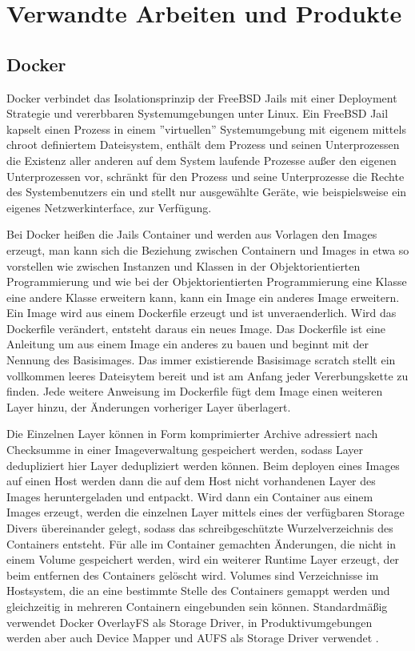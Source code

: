 \section{Verwandte Arbeiten und Produkte}
\label{sec:related-work}


\subsection{Docker}
Docker verbindet das Isolationsprinzip der FreeBSD Jails mit einer Deployment
Strategie und vererbbaren Systemumgebungen unter Linux.
Ein FreeBSD Jail kapselt einen Prozess in einem ''virtuellen'' Systemumgebung
mit eigenem mittels chroot definiertem Dateisystem, enthält dem Prozess und
seinen Unterprozessen die Existenz aller anderen auf dem System laufende
Prozesse außer den eigenen Unterprozessen vor, schränkt für den Prozess und
seine Unterprozesse die Rechte des Systembenutzers ein und stellt nur
ausgewählte Geräte, wie beispielsweise ein eigenes Netzwerkinterface, zur
Verfügung. \cite{FreeBSD-Jail-doc} \cite{FreeBSD-Jail-developer-comments}
\cite{FreeBSD-Jail-paper}

Bei Docker heißen die Jails Container und werden aus Vorlagen den Images
erzeugt, man kann sich die Beziehung zwischen Containern und Images in etwa so
vorstellen wie zwischen Instanzen und Klassen in der Objektorientierten
Programmierung und wie bei der Objektorientierten Programmierung eine Klasse
eine andere Klasse erweitern kann, kann ein Image ein anderes Image erweitern.
Ein Image wird aus einem Dockerfile erzeugt und ist unveraenderlich. Wird das
Dockerfile verändert, entsteht daraus ein neues Image. Das Dockerfile ist eine
Anleitung um aus einem Image ein anderes zu bauen und beginnt mit der Nennung
des Basisimages. Das immer existierende Basisimage scratch stellt ein vollkommen
leeres Dateisytem bereit und ist am Anfang jeder Vererbungskette zu finden. Jede
weitere Anweisung im Dockerfile fügt dem Image einen weiteren Layer hinzu, der
Änderungen vorheriger Layer überlagert.

Die Einzelnen Layer können in Form komprimierter Archive adressiert nach
Checksumme in einer Imageverwaltung gespeichert werden, sodass Layer
dedupliziert hier Layer dedupliziert werden können. Beim deployen eines Images
auf einen Host werden dann die auf dem Host nicht vorhandenen Layer des Images
heruntergeladen und entpackt. Wird dann ein Container aus einem Images erzeugt,
werden die einzelnen Layer mittels eines der verfügbaren Storage Divers
übereinander gelegt, sodass das schreibgeschützte Wurzelverzeichnis des
Containers entsteht. Für alle im Container gemachten Änderungen, die nicht in
einem Volume gespeichert werden, wird ein weiterer Runtime Layer erzeugt, der
beim entfernen des Containers gelöscht wird. Volumes sind Verzeichnisse im
Hostsystem, die an eine bestimmte Stelle des Containers gemappt werden und
gleichzeitig in mehreren Containern eingebunden sein können. Standardmäßig
verwendet Docker OverlayFS als Storage Driver, in Produktivumgebungen werden
aber auch Device Mapper und AUFS als Storage Driver verwendet
\cite{docker-storage-driver}.

